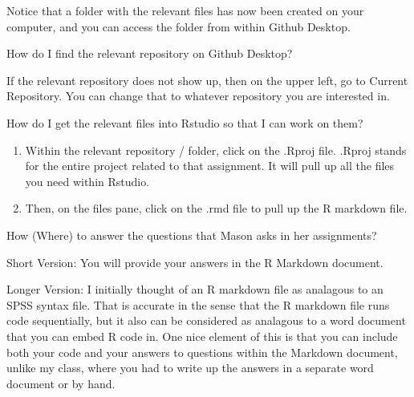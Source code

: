 \documentclass[
]{article}
\begin{document}
Notice that a folder with the relevant files has now been created on
your computer, and you can access the folder from within Github Desktop.

How do I find the relevant repository on Github Desktop?

If the relevant repository does not show up, then on the upper left, go
to Current Repository. You can change that to whatever repository you
are interested in.

How do I get the relevant files into Rstudio so that I can work on them?

\begin{enumerate}
\def\labelenumi{\arabic{enumi}.}
\item
  Within the relevant repository / folder, click on the .Rproj file.
  .Rproj stands for the entire project related to that assignment. It
  will pull up all the files you need within Rstudio.
\item
  Then, on the files pane, click on the .rmd file to pull up the R
  markdown file.
\end{enumerate}

How (Where) to answer the questions that Mason asks in her assignments?

Short Version: You will provide your answers in the R Markdown document.

Longer Version: I initially thought of an R markdown file as analagous
to an SPSS syntax file. That is accurate in the sense that the R
markdown file runs code sequentially, but it also can be considered as
analagous to a word document that you can embed R code in. One nice
element of this is that you can include both your code and your answers
to questions within the Markdown document, unlike my class, where you
had to write up the answers in a separate word document or by hand.
\end{document}
